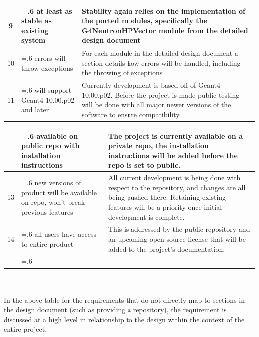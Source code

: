 \documentclass[12pt]{article}
\begin{document}
\begin{table}[h]
\begin{tabularx}{\textwidth}{c>{\hsize=.6\hsize}X>{\hsize=1.4\hsize}X}
9 & at least as stable as existing system & Stability again relies on the implementation of the ported modules, specifically the G4NeutronHPVector module from the detailed design document\\\hline

10 & errors will throw exceptions & For each module in the detailed design document a section details how errors will be handled, including the throwing of exceptions\\\hline

11 & will support Geant4 10.00.p02 and later & Currently development is based off of Geant4 10.00.p02. Before the project is made public testing will be done with all major newer versions of the software to ensure compatibility.\\\hline
\end{tabularx}
\end{table}

\clearpage
\begin{tabularx}{\textwidth}{c>{\hsize=.6\hsize}X>{\hsize=1.4\hsize}X}
\arrayrulecolor{lightgray}
\hline
12 & available on public repo with installation instructions & The project is currently available on a private repo, the installation instructions will be added before the repo is set to public.\\\hline

13 & new versions of product will be available on repo, won't break previous features & All current development is being done with respect to the repository, and changes are all being pushed there. Retaining existing features will be a priority once initial development is complete.\\\hline

14 & all users have access to entire product & This is addressed by the public repository and an upcoming open source license that will be added to the project's documentation.\\
\arrayrulecolor{black}
\bottomrule
\end{tabularx}\\\\

In the above table for the requirements that do not directly map to sections in the design document (such as providing a repository), the requirement is discussed at a high level in relationship to the design within the context of the entire project.
\end{document}
